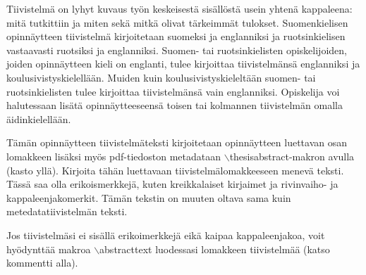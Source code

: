 \documentclass[finnish, 12pt, a4paper, elec, utf8, a-2b, online]{aaltothesis}
\date{21.9.2023}
\begin{document}
\makecoverpage{}

\makecopyrightpage{}


\begin{abstractpage}[finnish]
Tiivistelmä on lyhyt kuvaus työn keskeisestä sisällöstä usein yhtenä kappaleena:
mitä tutkittiin ja miten sekä mitkä olivat tärkeimmät tulokset. Suomenkielisen
opinnäytteen tiivistelmä kirjoitetaan suomeksi ja englanniksi ja ruotsinkielisen
vastaavasti ruotsiksi ja englanniksi. Suomen- tai ruotsinkielisten
opiskelijoiden, joiden opinnäytteen kieli on englanti, tulee kirjoittaa
tiivistelmänsä englanniksi ja koulusivistyskielellään. Muiden kuin
koulusivistyskieleltään suomen- tai ruotsinkielisten tulee kirjoittaa
tiivistelmänsä vain englanniksi. Opiskelija voi halutessaan lisätä
opinnäytteeseensä toisen tai kolmannen tiivistelmän omalla äidinkielellään.

Tämän opinnäytteen tiivistelmäteksti kirjoitetaan opinnäytteen luettavan osan 
lomakkeen lisäksi myös pdf-tiedoston metadataan 
$\backslash$thesisabstract-makron avulla (kasto yllä). Kirjoita tähän
luettavaan tiivistelmälomakkeeseen menevä teksti. Tässä saa olla erikoismerkkejä,
kuten kreikkalaiset kirjaimet ja rivinvaiho- ja kappaleenjakomerkit. Tämän
tekstin on muuten oltava sama kuin metedatatiivistelmän teksti.

Jos tiivistelmäsi ei sisällä erikoimerkkejä eikä kaipaa kappaleenjakoa, voit
hyödynttää makroa $\backslash$abstracttext luodessasi lomakkeen tiivistelmää
(katso kommentti alla).
\end{abstractpage}
\end{document}
